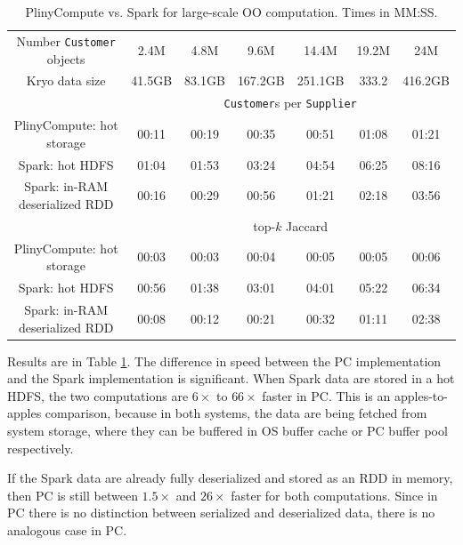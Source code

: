 \begin{table}[h!]
\small
\begin{center}
\begin{tabular}{|c||c|c|c|c|c|c|}
\hline
Number \texttt{Customer} objects &2.4M & 4.8M & 9.6M  & 14.4M & 19.2M & 24M \\
Kryo data size &41.5GB & 83.1GB & 167.2GB &251.1GB &333.2 &416.2GB \\
\hline
& \multicolumn{6}{c|}{\texttt{Customer}s per \texttt{Supplier}} \\
\hline
PlinyCompute: hot storage & 00:11&	00:19&	00:35&	00:51&	01:08&	01:21 \\
Spark: hot HDFS & 01:04&	01:53&	03:24&	04:54&	06:25&	08:16\\
Spark: in-RAM deserialized RDD & 00:16& 	00:29& 	00:56& 	01:21& 	02:18& 	03:56\\
\hline
& \multicolumn{6}{c|}{top-$k$ Jaccard} \\
\hline
PlinyCompute: hot storage & 00:03&	00:03&	00:04&	00:05&	00:05&	00:06 \\
Spark: hot HDFS & 00:56&	01:38&	03:01 & 04:01&	05:22&	06:34\\
Spark: in-RAM deserialized RDD & 00:08& 	00:12& 	00:21 & 00:32& 	01:11& 	02:38\\
\hline
\end{tabular}
\caption{PlinyCompute vs. Spark for large-scale OO computation. Times in MM:SS.}
\label{fig:TPC}
\end{center}
\end{table}

Results are in Table \ref{fig:TPC}.  The difference in speed between the PC implementation and the Spark implementation
is significant.
When Spark data
are stored in
a hot HDFS, the two computations are $6\times$ to $66\times$ faster in PC.  
This is an apples-to-apples comparison, because in both systems, the data are being fetched from system storage, where they
can be buffered in OS buffer cache or PC buffer pool respectively.

If the Spark data are already
fully deserialized and stored as an RDD in memory, then PC is still 
between $1.5\times$ and $26\times$ faster
for both computations. Since in PC there is no distinction between
serialized and deserialized data, there is no analogous case in PC. 


